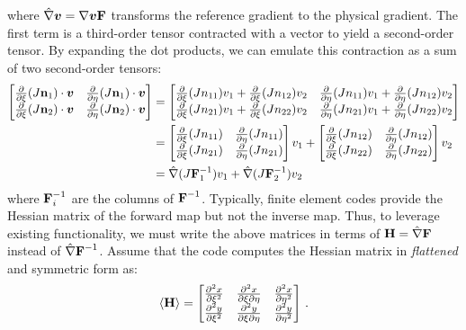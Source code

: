 \documentclass[../doc.tex]{subfiles}
\begin{document}
where $\hat{\nabla}\boldsymbol{v} = \nabla\boldsymbol{v}\boldsymbol{\mathrm{F}}$ transforms the reference gradient to the physical gradient. The first term is a third-order tensor contracted with a vector to yield a second-order tensor. By expanding the dot products, we can emulate this contraction as a sum of two second-order tensors: 
	\begin{equation}
	\begin{aligned}
		\begin{bmatrix} 
			\frac{\partial }{\partial \xi}(J\boldsymbol{\mathrm{n}}_1) \cdot \boldsymbol{v} & \frac{\partial }{\partial \eta}(J\boldsymbol{\mathrm{n}}_1)\cdot\boldsymbol{v} \\ 
			\frac{\partial }{\partial \xi}(J\boldsymbol{\mathrm{n}}_2)\cdot\boldsymbol{v} & \frac{\partial }{\partial \eta}(J\boldsymbol{\mathrm{n}}_2)\cdot\boldsymbol{v} 
		\end{bmatrix} &= 
		\begin{bmatrix} 
			\frac{\partial }{\partial \xi}(Jn_{11})v_1 + \frac{\partial }{\partial \xi}(Jn_{12})v_2 & \frac{\partial }{\partial \eta}(Jn_{11})v_1 + \frac{\partial }{\partial \eta}(Jn_{12})v_2 \\
			\frac{\partial }{\partial \xi}(Jn_{21})v_1 + \frac{\partial }{\partial \xi}(Jn_{22})v_2 & \frac{\partial }{\partial \eta}(Jn_{21})v_1 + \frac{\partial }{\partial \eta}(Jn_{22})v_2 
		\end{bmatrix} \\
		&= \begin{bmatrix} 
			\frac{\partial }{\partial \xi}(Jn_{11}) & \frac{\partial }{\partial \eta}(Jn_{11}) \\ 
			\frac{\partial }{\partial \xi}(Jn_{21}) & \frac{\partial }{\partial \eta}(Jn_{21}) 
		\end{bmatrix} v_1 + 
		\begin{bmatrix} 
			\frac{\partial }{\partial \xi}(Jn_{12}) & \frac{\partial }{\partial \eta}(Jn_{12}) \\ 
			\frac{\partial }{\partial \xi}(Jn_{22}) & \frac{\partial }{\partial \eta}(Jn_{22}) 
		\end{bmatrix} v_2 \\
		&= \hat{\nabla} (J\boldsymbol{\mathrm{F}}_1^{-1}) v_1 + \hat{\nabla}(J \boldsymbol{\mathrm{F}}_2^{-1}) v_2
	\end{aligned}
	\end{equation}
where $\boldsymbol{\mathrm{F}}^{-1}_i$ are the columns of $\boldsymbol{\mathrm{F}}^{-1}$. Typically, finite element codes provide the Hessian matrix of the forward map but not the inverse map. Thus, to leverage existing functionality, we must write the above matrices in terms of $\boldsymbol{\mathrm{H}} = \hat{\nabla}\boldsymbol{\mathrm{F}}$ instead of $\hat{\nabla}\boldsymbol{\mathrm{F}}^{-1}$. Assume that the code computes the Hessian matrix in \emph{flattened} and symmetric form as:  
	\begin{equation}
		\langle \boldsymbol{\mathrm{H}} \rangle = \begin{bmatrix} 
			\frac{\partial^2 x}{\partial \xi^2} & \frac{\partial^2 x}{\partial\xi\partial\eta} & \frac{\partial^2 x}{\partial\eta^2} \\
			\frac{\partial^2 y}{\partial \xi^2} & \frac{\partial^2 y}{\partial\xi\partial\eta} & \frac{\partial^2 y}{\partial\eta^2}
		\end{bmatrix} \,. 
	\end{equation}
\end{document}
